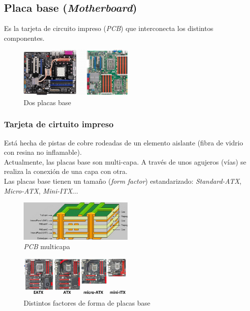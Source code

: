 \documentclass[12pt,spanish]{article}
\begin{document}
\subsection{Placa base (\textit{Motherboard})}
Es la tarjeta de circuito impreso (\textit{PCB}) que interconecta los distintos componentes.
\begin{figure}[H]
	\centering
	\includegraphics[width=0.5\textwidth]{mobos.png}
	\caption{Dos placas base}
\end{figure}
\subsubsection{Tarjeta de cirtuito impreso}

Está hecha de pistas de cobre rodeadas de un elemento aislante (fibra de vidrio con resina no inflamable).\\
Actualmente, las placas base son multi-capa. A través de unos agujeros (vías) se realiza la conexión de una capa con otra.\\
Las placas base tienen un tamaño (\textit{form factor}) estandarizado: \textit{Standard-ATX}, \textit{Micro-ATX}, \textit{Mini-ITX}...
\begin{figure}[H]
	\centering
	\includegraphics[width=0.5\textwidth]{pcb.jpg}
	\caption{\textit{PCB} multicapa}
\end{figure}

\begin{figure}[H]
	\centering
	\includegraphics[width=0.5\textwidth]{moboformfactor.png}
	\caption{Distintos factores de forma de placas base}
\end{figure}
\end{document}

